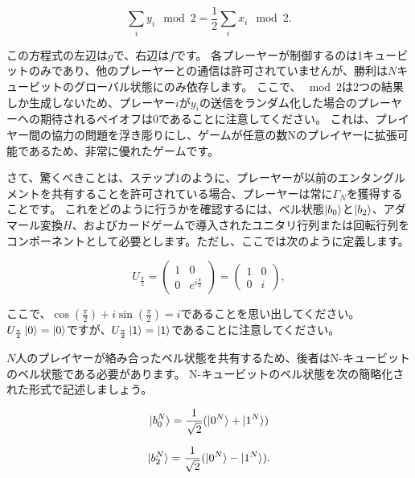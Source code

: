 \begin{equation}
\label{198}
\sum_i y_i \mod 2 
=
\frac{1}{2} \sum_i x_i \mod 2.
\end{equation}

この方程式の左辺は$g$で、右辺は$f$です。 各プレーヤーが制御するのは1キュービットのみであり、他のプレーヤーとの通信は許可されていませんが、勝利は$N$キュービットのグローバル状態にのみ依存します。
ここで、$\mod 2$は2つの結果しか生成しないため、プレーヤー$i$が$y_i$の送信をランダム化した場合のプレーヤーへの期待されるペイオフは$0$であることに注意してください。
これは、プレイヤー間の協力の問題を浮き彫りにし、ゲームが任意の数Nのプレイヤーに拡張可能であるため、非常に優れたゲームです。

さて、驚くべきことは、ステップ$1$のように、プレーヤーが以前のエンタングルメントを共有することを許可されている場合、プレーヤーは常に$\Gamma_N$を獲得することです。
これをどのように行うかを確認するには、ベル状態$\ket{b_0}$と$\ket{b_2}$、アダマール変換$H$、およびカードゲームで導入されたユニタリ行列または回転行列をコンポーネントとして必要とします。ただし、ここでは次のように定義します。

\begin{equation}
\label{199}
U_{\frac{\pi}{2} }
=
\left( \begin{array}{cc}
 1 & 0 \\
 0 & e^{i \frac{\pi}{2}}
\end{array} \right) 
=
\left( \begin{array}{cc}
 1 & 0 \\
 0 & i
\end{array} \right),
\end{equation}

ここで、$\cos ( \frac{\pi}{2}) + i \sin( \frac{\pi}{2}) =i$であることを思い出してください。$U_{\frac{\pi}{2}} \ket{0} = \ket{0}$ですが、$U_{\frac{\pi}{2}} \ket{1} = \ket{1}$であることに注意してください。

$N$人のプレイヤーが絡み合ったベル状態を共有するため、後者はN-キュービットのベル状態である必要があります。 N-キュービットのベル状態を次の簡略化された形式で記述しましょう。

\begin{equation}
\label{200}
\ket{b_0^N}
=
\frac{1}{\sqrt{2}}(\ket{0^N} + \ket{1^N} )
\end{equation}

\begin{equation}
\label{201}
\ket{b_2^N}
=
\frac{1}{\sqrt{2}}(\ket{0^N} - \ket{1^N} ).
\end{equation}

